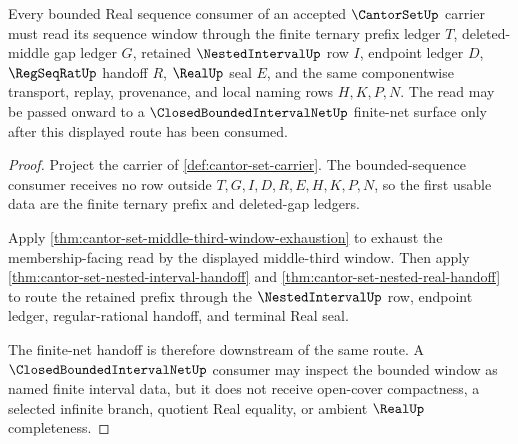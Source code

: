 \begin{theorem}
\label{thm:cantor-set-root-bounded-sequence-window}
Every bounded Real sequence consumer of an accepted $\CantorSetUp$ carrier must read its sequence window through the finite ternary prefix ledger $T$, deleted-middle gap ledger $G$, retained $\NestedIntervalUp$ row $I$, endpoint ledger $D$, $\RegSeqRatUp$ handoff $R$, $\RealUp$ seal $E$, and the same componentwise transport, replay, provenance, and local naming rows $H,K,P,N$. The read may be passed onward to a $\ClosedBoundedIntervalNetUp$ finite-net surface only after this displayed route has been consumed.
\end{theorem}
\begin{proof}
Project the carrier of \autoref{def:cantor-set-carrier}. The bounded-sequence consumer receives no row outside $T,G,I,D,R,E,H,K,P,N$, so the first usable data are the finite ternary prefix and deleted-gap ledgers.

Apply \autoref{thm:cantor-set-middle-third-window-exhaustion} to exhaust the membership-facing read by the displayed middle-third window. Then apply \autoref{thm:cantor-set-nested-interval-handoff} and \autoref{thm:cantor-set-nested-real-handoff} to route the retained prefix through the $\NestedIntervalUp$ row, endpoint ledger, regular-rational handoff, and terminal Real seal.

The finite-net handoff is therefore downstream of the same route. A $\ClosedBoundedIntervalNetUp$ consumer may inspect the bounded window as named finite interval data, but it does not receive open-cover compactness, a selected infinite branch, quotient Real equality, or ambient $\RealUp$ completeness.
\end{proof}

